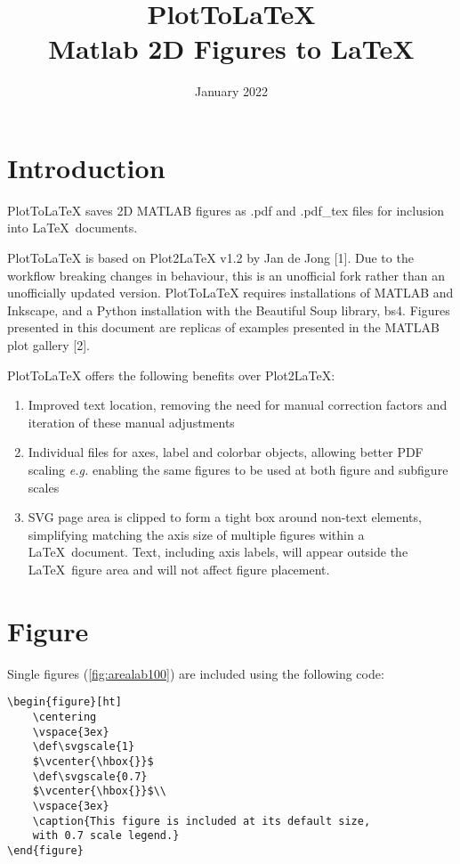 \documentclass{article}
\title{PlotToLaTeX\\ \large Matlab 2D Figures to \LaTeX}
\author{}
\date{January 2022}
\begin{document}
\maketitle

\section{Introduction}
PlotToLaTeX saves 2D MATLAB figures as .pdf and .pdf\_tex files for inclusion into \LaTeX\ documents.

PlotToLaTeX is based on Plot2LaTeX v1.2 by Jan de Jong [1]. Due to the workflow breaking changes in behaviour, this is an unofficial fork rather than an unofficially updated version. PlotToLaTeX requires installations of MATLAB and Inkscape, and a Python installation with the Beautiful Soup library, bs4. Figures presented in this document are replicas of examples presented in the MATLAB plot gallery [2].

PlotToLaTeX offers the following benefits over Plot2LaTeX:
\begin{enumerate}
    \item Improved text location, removing the need for manual correction factors and iteration of these manual adjustments
    \item Individual files for axes, label and colorbar objects, allowing better PDF scaling \textit{e.g.} enabling the same figures to be used at both figure and subfigure scales
    \item SVG page area is clipped to form a tight box around non-text elements, simplifying matching the axis size of multiple figures within a \LaTeX\ document. Text, including axis labels, will appear outside the \LaTeX\ figure area and will not affect figure placement.
\end{enumerate}

\section{Figure}
Single figures (\ref{fig:arealab100}) are included using the following code:
\begin{verbatim}
\begin{figure}[ht]
    \centering
    \vspace{3ex}
    \def\svgscale{1}
    $\vcenter{\hbox{}}$
    \def\svgscale{0.7}
    $\vcenter{\hbox{}}$\\
    \vspace{3ex}
    \caption{This figure is included at its default size,
    with 0.7 scale legend.}
\end{figure}
\end{verbatim}
\end{document}
